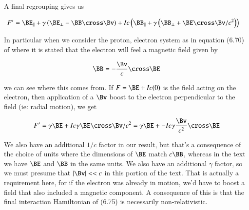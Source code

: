 A final regrouping gives us

\begin{align}\label{eqn:boostCommutator:50}
F'
&=
\BE_\parallel + \gamma \left( \BE_\perp - \BB \cross \Bv \right)
+I c \left( \BB_\parallel + \gamma \left( \BB_\perp + \BE \cross \Bv/c^2 \right) \right)
\end{align}

In particular when we consider the proton, electron system as in equation (6.70) of \citep{desai2009quantum} where it is stated that the electron will feel a magnetic field given by

\begin{align}\label{eqn:boostCommutator:51}
\BB = - \frac{\Bv}{c} \cross \BE
\end{align}

we can see where this comes from.  If $F = \BE + I c (0)$ is the field acting on the electron, then application of a $\Bv$ boost to the electron perpendicular to the field (ie: radial motion), we get

\begin{align}\label{eqn:boostCommutator:52}
F' = \gamma \BE + I c \gamma \BE \cross \Bv/c^2 =
\gamma \BE + -I c \gamma \frac{\Bv}{c^2} \cross \BE
\end{align}

We also have an additional $1/c$ factor in our result, but that's a consequence of the choice of units where the dimensions of $\BE$ match $c \BB$, whereas in the text we have $\BE$ and $\BB$ in the same units.  We also have an additional $\gamma$ factor, so we must presume that $\Abs{\Bv} << c$ in this portion of the text.  That is actually a requirement here, for if the electron was already in motion, we'd have to boost a field that also included a magnetic component.  A consequence of this is that the final interaction Hamiltonian of (6.75) is necessarily non-relativistic.

\EndArticle
